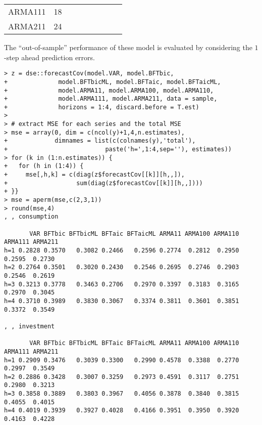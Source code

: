 \documentclass[]{article}
\begin{document}
\begin{table}
\begin{tabular}[t]{lrlllllll}
ARMA111 & 18 & \cellcolor{white}{124.6} & \cellcolor{white}{509.5} & \cellcolor{white}{1055} & \cellcolor{white}{1127.2} & \cellcolor{white}{1055.9} & \cellcolor{white}{1056.7} & \cellcolor{white}{1055.1}\\
ARMA211 & 24 & \cellcolor[HTML]{90EE90}{121.4} & \cellcolor[HTML]{90EE90}{506.1} & \cellcolor{white}{1060.3} & \cellcolor{white}{1156.5} & \cellcolor{white}{1061.7} & \cellcolor{white}{1063.3} & \cellcolor{white}{1060.3}\\
\bottomrule
\end{tabular}
\end{table}

The ``out-of-sample'' performance of these model is evaluated by
considering the \(1\)-step ahead prediction errors.

\begin{verbatim}
> z = dse::forecastCov(model.VAR, model.BFTbic, 
+              model.BFTbicML, model.BFTaic, model.BFTaicML, 
+              model.ARMA11, model.ARMA100, model.ARMA110, 
+              model.ARMA111, model.ARMA211, data = sample, 
+              horizons = 1:4, discard.before = T.est)
> 
> # extract MSE for each series and the total MSE
> mse = array(0, dim = c(ncol(y)+1,4,n.estimates), 
+             dimnames = list(c(colnames(y),'total'), 
+                           paste('h=',1:4,sep=''), estimates))
> for (k in (1:n.estimates)) {
+   for (h in (1:4)) {
+     mse[,h,k] = c(diag(z$forecastCov[[k]][h,,]),
+                   sum(diag(z$forecastCov[[k]][h,,])))
+ }}
> mse = aperm(mse,c(2,3,1))
> round(mse,4)
, , consumption

       VAR BFTbic BFTbicML BFTaic BFTaicML ARMA11 ARMA100 ARMA110 ARMA111 ARMA211
h=1 0.2828 0.3570   0.3082 0.2466   0.2596 0.2774  0.2812  0.2950  0.2595  0.2730
h=2 0.2764 0.3501   0.3020 0.2430   0.2546 0.2695  0.2746  0.2903  0.2546  0.2619
h=3 0.3213 0.3778   0.3463 0.2706   0.2970 0.3397  0.3183  0.3165  0.2970  0.3045
h=4 0.3710 0.3989   0.3830 0.3067   0.3374 0.3811  0.3601  0.3851  0.3372  0.3549

, , investment

       VAR BFTbic BFTbicML BFTaic BFTaicML ARMA11 ARMA100 ARMA110 ARMA111 ARMA211
h=1 0.2909 0.3476   0.3039 0.3300   0.2990 0.4578  0.3388  0.2770  0.2997  0.3549
h=2 0.2886 0.3428   0.3007 0.3259   0.2973 0.4591  0.3117  0.2751  0.2980  0.3213
h=3 0.3858 0.3889   0.3803 0.3967   0.4056 0.3878  0.3840  0.3815  0.4055  0.4015
h=4 0.4019 0.3939   0.3927 0.4028   0.4166 0.3951  0.3950  0.3920  0.4163  0.4228


\end{verbatim}
\end{document}
